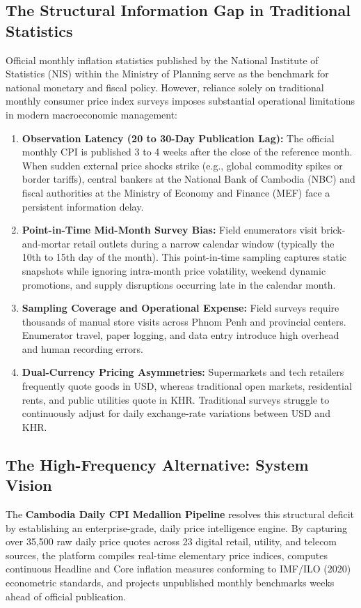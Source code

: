 \documentclass[11pt,a4paper]{article}
\begin{document}
\subsection{The Structural Information Gap in Traditional Statistics}
Official monthly inflation statistics published by the National Institute of Statistics (NIS) within the Ministry of Planning serve as the benchmark for national monetary and fiscal policy. However, reliance solely on traditional monthly consumer price index surveys imposes substantial operational limitations in modern macroeconomic management:
\begin{enumerate}
    \item \textbf{Observation Latency (20 to 30-Day Publication Lag):} The official monthly CPI is published 3 to 4 weeks after the close of the reference month. When sudden external price shocks strike (e.g., global commodity spikes or border tariffs), central bankers at the National Bank of Cambodia (NBC) and fiscal authorities at the Ministry of Economy and Finance (MEF) face a persistent information delay.
    \item \textbf{Point-in-Time Mid-Month Survey Bias:} Field enumerators visit brick-and-mortar retail outlets during a narrow calendar window (typically the 10th to 15th day of the month). This point-in-time sampling captures static snapshots while ignoring intra-month price volatility, weekend dynamic promotions, and supply disruptions occurring late in the calendar month.
    \item \textbf{Sampling Coverage and Operational Expense:} Field surveys require thousands of manual store visits across Phnom Penh and provincial centers. Enumerator travel, paper logging, and data entry introduce high overhead and human recording errors.
    \item \textbf{Dual-Currency Pricing Asymmetries:} Supermarkets and tech retailers frequently quote goods in USD, whereas traditional open markets, residential rents, and public utilities quote in KHR. Traditional surveys struggle to continuously adjust for daily exchange-rate variations between USD and KHR.
\end{enumerate}

\subsection{The High-Frequency Alternative: System Vision}
The \textbf{Cambodia Daily CPI Medallion Pipeline} resolves this structural deficit by establishing an enterprise-grade, daily price intelligence engine. By capturing over 35,500 raw daily price quotes across 23 digital retail, utility, and telecom sources, the platform compiles real-time elementary price indices, computes continuous Headline and Core inflation measures conforming to IMF/ILO (2020) econometric standards, and projects unpublished monthly benchmarks weeks ahead of official publication.
\end{document}
